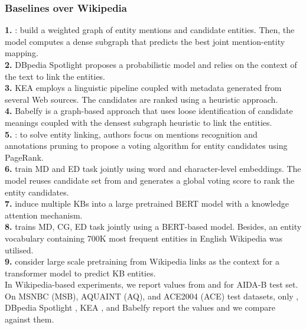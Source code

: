 \documentclass[11pt,a4paper]{article}
\begin{document}
\subsubsection{Baselines over Wikipedia}
\textbf{1.} \cite{DBLP:conf/emnlp/HoffartYBFPSTTW11}: build a weighted graph of entity mentions and candidate entities. Then, the model computes a dense subgraph that predicts the best joint mention-entity mapping.\\
\textbf{2.} DBpedia Spotlight \cite{MendesJGB11} proposes a probabilistic model and relies on the context of the text to link the entities.\\
\textbf{3.} KEA \cite{steinmetz2013semantic} employs a linguistic pipeline coupled with metadata generated from several Web sources. The candidates are ranked using a heuristic approach.\\
\textbf{4.} Babelfy \cite{moro2014entity} is a graph-based approach that uses loose identification of candidate meanings coupled with the densest subgraph heuristic to link the entities.\\
\textbf{5.} \citet{piccinno2014tagme}: to solve entity linking, authors focus on mentions recognition and annotations pruning to propose a voting algorithm for entity candidates using PageRank.\\
\textbf{6.} \citet{kolitsas2018end} train MD and ED task jointly using word and character-level embeddings. The model reuses candidate set from \cite{ganea2017deep} and generates a global voting score to rank the entity candidates.\\
\textbf{7.} \citet{peters2019knowledge} induce multiple KBs into a large pretrained BERT model with a knowledge attention mechanism.\\
\textbf{8.} \citet{broscheit2019investigating} trains MD, CG, ED task jointly using a BERT-based model. Besides, an entity vocabulary containing 700K most frequent entities in English Wikipedia was utilised. \\
\textbf{9.} \citet{evry2020empirical} consider large scale pretraining from Wikipedia links as the context for a transformer model to predict KB entities.\\
In Wikipedia-based experiments, we report values from \cite{evry2020empirical} and \cite{kolitsas2018end} for AIDA-B test set. 
On MSNBC (MSB), AQUAINT (AQ), and ACE2004 (ACE) test datasets, only \cite{kolitsas2018end}, DBpedia Spotlight \cite{MendesJGB11}, KEA \cite{steinmetz2013semantic}, and Babelfy \cite{moro2014entity} report the values and we compare against them. 
\end{document}
